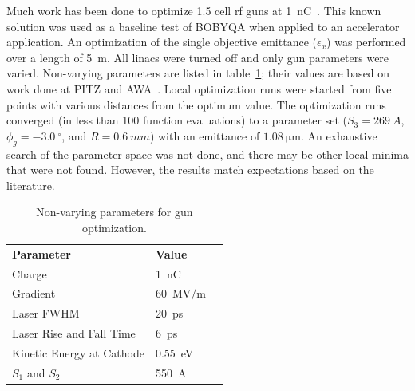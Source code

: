 \documentclass{iitthesis}
\begin{document}
 \label{sec:gunbobyqa}
Much work has been done to optimize 1.5 cell rf guns
at \SI{1}{nC}~\cite{Stephan:2010zza}. This known solution was used as 
a baseline test of BOBYQA when applied to an accelerator application.
An optimization of the single objective emittance ($\epsilon_x$) was 
performed over a length of \SI{5}{m}. All linacs were turned off and only gun parameters were varied. 
Non-varying parameters are listed in table~\ref{tab:gun}; 
their values are based on work done at PITZ and AWA~\cite{pitz, benchmark}.
Local optimization runs were started from five points with various distances from the optimum value. 
The optimization runs converged (in less than 100 function evaluations) to a parameter set ($S_3=\SI{269}{A}$, $\phi_g=\SI{-3.0}{^{\circ}}$, and $R=\SI{0.6}{mm}$) with an emittance of $\SI{1.08}{\um}$.
An exhaustive search of the parameter space was not done, and there may be other local minima that were not found.
However, the results match expectations based on the literature. 
\begin{table}[h] 
	\caption{\label{tab:gun} Non-varying parameters for gun optimization.}
	\begin{center}
		\begin{tabular}{lll}
			\textbf{Parameter} & \textbf{Value} \\
			Charge  & \SI{1}{nC} \\
			Gradient & \SI{60}{MV/m} \\
			Laser FWHM & \SI{20}{ps} \\
			Laser Rise and Fall Time & \SI{6}{ps} \\
			Kinetic Energy at Cathode  & \SI{0.55}{eV} \\
			$S_1$ and $S_2$ & \SI{550}{A} \\
		\end{tabular}
	\end{center}
\end{table}
\end{document}
